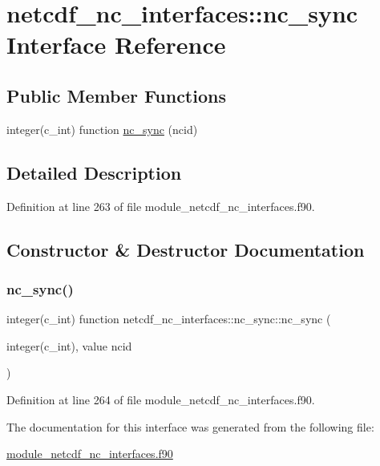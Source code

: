 \hypertarget{interfacenetcdf__nc__interfaces_1_1nc__sync}{}\section{netcdf\+\_\+nc\+\_\+interfaces\+:\+:nc\+\_\+sync Interface Reference}
\label{interfacenetcdf__nc__interfaces_1_1nc__sync}
\subsection*{Public Member Functions}
\begin{DoxyCompactItemize}
\item 
integer(c\+\_\+int) function \hyperlink{interfacenetcdf__nc__interfaces_1_1nc__sync_a73190c7029c0ad4e82a0a03a79bc7dc4}{nc\+\_\+sync} (ncid)
\end{DoxyCompactItemize}


\subsection{Detailed Description}


Definition at line 263 of file module\+\_\+netcdf\+\_\+nc\+\_\+interfaces.\+f90.



\subsection{Constructor \& Destructor Documentation}
\mbox{\label{interfacenetcdf__nc__interfaces_1_1nc__sync_a73190c7029c0ad4e82a0a03a79bc7dc4}} 
\subsubsection{\texorpdfstring{nc\+\_\+sync()}{nc\_sync()}}
{\footnotesize\ttfamily integer(c\+\_\+int) function netcdf\+\_\+nc\+\_\+interfaces\+::nc\+\_\+sync\+::nc\+\_\+sync (\begin{DoxyParamCaption}\item[{integer(c\+\_\+int), value}]{ncid }\end{DoxyParamCaption})}



Definition at line 264 of file module\+\_\+netcdf\+\_\+nc\+\_\+interfaces.\+f90.



The documentation for this interface was generated from the following file\+:\begin{DoxyCompactItemize}
\item 
\hyperlink{module__netcdf__nc__interfaces_8f90}{module\+\_\+netcdf\+\_\+nc\+\_\+interfaces.\+f90}\end{DoxyCompactItemize}
